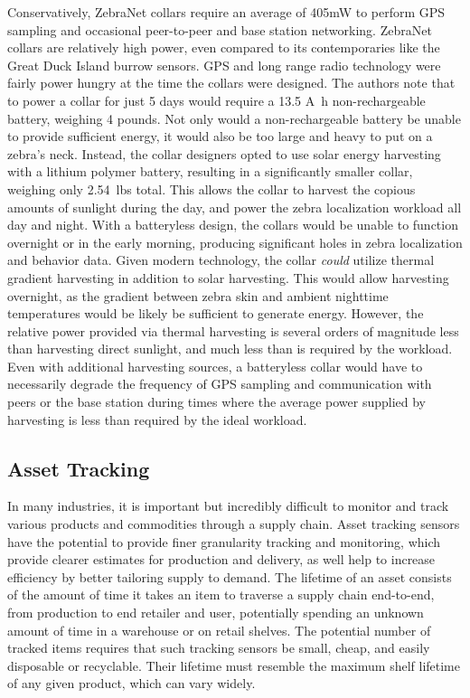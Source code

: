 Conservatively, ZebraNet collars require an average of 405\si{\milli\watt} to perform GPS sampling and occasional peer-to-peer and base station networking. ZebraNet collars are relatively high power, even compared to its contemporaries like the Great Duck Island burrow sensors.
GPS and long range radio technology were fairly power hungry at the time the collars were designed.
The authors note that to power a collar for just 5 days would require a 13.5 \si{\ampere\hour} non-rechargeable battery, weighing 4 pounds. Not only would a non-rechargeable battery be unable to provide sufficient energy, it would also be too large and heavy to put on a zebra's neck.
Instead, the collar designers opted to use solar energy harvesting with a lithium polymer battery, resulting in a significantly smaller collar, weighing only 2.54~lbs total. 
This allows the collar to harvest the copious amounts of sunlight during the day, and power the zebra localization workload all day and night. 
With a batteryless design, the collars would be unable to function overnight or in the early morning, producing significant holes in zebra localization and behavior data.
Given modern technology, the collar \textit{could} utilize thermal gradient harvesting in addition to solar harvesting. This would allow harvesting overnight, as the gradient between zebra skin and ambient nighttime temperatures would be likely be sufficient to generate energy.
However, the relative power provided via thermal harvesting is several orders of magnitude less than harvesting direct sunlight, and much less than is required by the workload.
Even with additional harvesting sources, a batteryless collar would have to necessarily degrade the frequency of GPS sampling and communication with peers or the base station during times where the average power supplied by harvesting is less than required by the ideal workload. 

\subsection{Asset Tracking}

In many industries, it is important but incredibly difficult to monitor and track various products and commodities through a supply chain.
Asset tracking sensors have the potential to provide finer granularity tracking and monitoring, which provide clearer estimates for production and delivery, as well help to increase efficiency by better tailoring supply to demand.
The lifetime of an asset consists of the amount of time it takes an item to traverse a supply chain end-to-end, from production to end retailer and user, potentially spending an unknown amount of time in a warehouse or on retail shelves.
The potential number of tracked items requires that such tracking sensors be small, cheap, and easily disposable or recyclable. Their lifetime must resemble the maximum shelf lifetime of any given product, which can vary widely.


